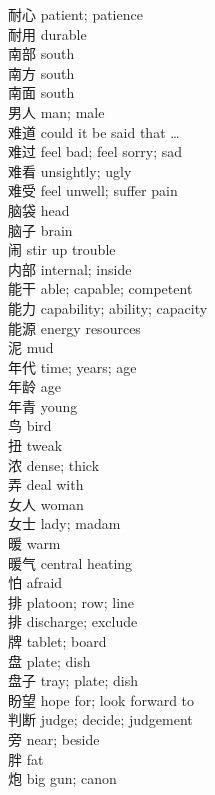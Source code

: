 耐心 \quad patient; patience\\
耐用 \quad durable\\
南部 \quad south\\
南方 \quad south\\
南面 \quad south\\
男人 \quad man; male\\
难道 \quad could it be said that …\\
难过 \quad feel bad; feel sorry; sad\\
难看 \quad unsightly; ugly\\
难受 \quad feel unwell; suffer pain\\
脑袋 \quad head\\
脑子 \quad brain\\
闹 \quad stir up trouble\\
内部 \quad internal; inside\\
能干 \quad able; capable; competent\\
能力 \quad capability; ability; capacity\\
能源 \quad energy resources\\
泥 \quad mud\\
年代 \quad time; years; age\\
年龄 \quad age\\
年青 \quad young\\
鸟 \quad bird\\
扭 \quad tweak\\
浓 \quad dense; thick\\
弄 \quad deal with\\
女人 \quad woman\\
女士 \quad lady; madam\\
暖 \quad warm\\
暖气 \quad central heating\\
怕 \quad afraid\\
排 \quad platoon; row; line\\
排 \quad discharge; exclude\\
牌 \quad tablet; board\\
盘 \quad plate; dish\\
盘子 \quad tray; plate; dish\\
盼望 \quad hope for; look forward to\\
判断 \quad judge; decide; judgement\\
旁 \quad near; beside\\
胖 \quad fat\\
炮 \quad big gun; canon\\
